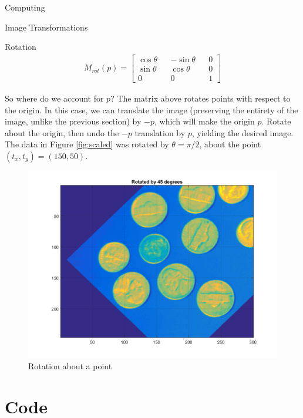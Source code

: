 \begin{section}{Computing}
\begin{homeworkSection}{Image Transformations}
\begin{subsubsection}{Rotation}
\begin{align*}
    M_{rot}(p) = \begin{bmatrix} \cos \theta && -\sin\theta && 0 \\
        \sin\theta && \cos\theta && 0 \\
        0 && 0 && 1 \end{bmatrix}
\end{align*}

So where do we account for $p$? The matrix above rotates points with respect to the origin. In this case, we can translate the image (preserving the entirety of the image, unlike the previous section) by $-p$, which will make the origin $p$. Rotate about the origin, then undo the $-p$ translation by $p$, yielding the desired image.
\\

The data in Figure \ref{fig:scaled} was rotated by $\theta = \pi/2$, about the point $(t_x, t_y) = (150, 50)$. 

\begin{figure}[!h]
\centering
\includegraphics[width=0.75\columnwidth]{../data/rotated} %
\caption{Rotation about a point}
\label{fig:rotated}
\end{figure}
\end{subsubsection}

\end{homeworkSection}



\end{section}



\newpage

\appendix

\section{Code}

